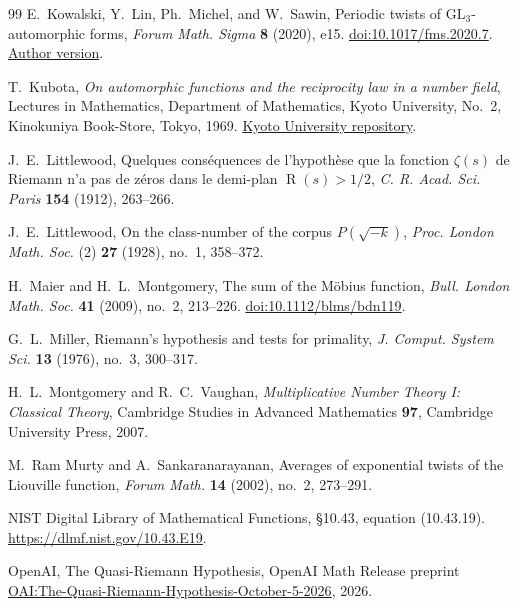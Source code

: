 \documentclass[11pt,a4paper]{article}
\numberwithin{equation}{section}
\numberwithin{figure}{section}
\theoremstyle{definition}
\theoremstyle{remark}
\begin{document}
\begin{thebibliography}{99}
E.~Kowalski, Y.~Lin, Ph.~Michel, and W.~Sawin,
Periodic twists of $\mathrm{GL}_3$-automorphic forms,
\emph{Forum Math. Sigma} \textbf{8} (2020), e15.
\href{https://doi.org/10.1017/fms.2020.7}{doi:10.1017/fms.2020.7}.
\href{https://people.math.ethz.ch/~kowalski/gl3-twists.pdf}{Author version}.

T.~Kubota,
\emph{On automorphic functions and the reciprocity law in a number field},
Lectures in Mathematics, Department of Mathematics, Kyoto University,
No.~2, Kinokuniya Book-Store, Tokyo, 1969.
\href{https://hdl.handle.net/2433/84907}{Kyoto University repository}.

J.~E.~Littlewood,
Quelques cons\'equences de l'hypoth\`ese que la fonction $\zeta(s)$ de
Riemann n'a pas de z\'eros dans le demi-plan $\operatorname{R}(s)>1/2$,
\emph{C. R. Acad. Sci. Paris} \textbf{154} (1912), 263--266.

J.~E.~Littlewood,
On the class-number of the corpus $P(\sqrt{-k})$,
\emph{Proc. London Math. Soc.} (2) \textbf{27} (1928),
no.~1, 358--372.

H.~Maier and H.~L.~Montgomery,
The sum of the M\"obius function,
\emph{Bull. London Math. Soc.} \textbf{41} (2009), no.~2, 213--226.
\href{https://doi.org/10.1112/blms/bdn119}
{doi:10.1112/blms/bdn119}.

G.~L.~Miller,
Riemann's hypothesis and tests for primality,
\emph{J. Comput. System Sci.} \textbf{13} (1976), no.~3, 300--317.

H.~L.~Montgomery and R.~C.~Vaughan,
\emph{Multiplicative Number Theory I: Classical Theory},
Cambridge Studies in Advanced Mathematics \textbf{97},
Cambridge University Press, 2007.

M.~Ram Murty and A.~Sankaranarayanan,
Averages of exponential twists of the Liouville function,
\emph{Forum Math.} \textbf{14} (2002), no.~2, 273--291.

{\raggedright
NIST Digital Library of Mathematical Functions,
\S10.43, equation (10.43.19).
\href{https://dlmf.nist.gov/10.43.E19}{https://dlmf.nist.gov/10.43.E19}.
\par}

OpenAI,
The Quasi-Riemann Hypothesis,
OpenAI Math Release preprint
\href{https://github.com/openai/math/blob/fd4aeeb2ee4fc729c18d98444fed42fd0529eeeb/preprints/The-Quasi-Riemann-Hypothesis-October-5-2026/paper2.pdf}{OAI:The-Quasi-Riemann-Hypothesis-October-5-2026},
2026.


\end{thebibliography}
\end{document}
